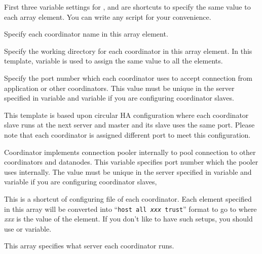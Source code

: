   First three variable settings for ,  and
   are shortcuts to specify the same value to each array element.
  You can write any script for your convenience.
  
  
      Specify each coordinator name in this array element.
  
  
      Specify the working directory for each coordinator in this array element.
      In this template,  variable is used to assign the same value to
	  all the elements.
  
  
      Specify the port number which each coordinator uses to accept connection from application or
	  other coordinators.
      This value must be unique in the server specified in  variable and
	   variable if you are configuring coordinator slaves.
      
      This template is based upon circular HA configuration
      where each coordinator slave runs at the next server and master and its slave uses the same port.
      Please note that each coordinator is assigned different port to meet this configuration.
  
  
      Coordinator implements connection pooler internally to pool connection to other coordinators and datanodes.
      This variable specifies port number which the pooler uses internally.
      The value must be unique in the server specified in  variable and
	   variable if you are configuring coordinator slaves,
  			
  			
      This is a shortcut of configuring  file of each coordinator.
      Each element specified in this array will be converted into ``\texttt{host all \textit{xxx} trust}''
      format to go to  where \textit{xxx} is the value of the element.
      If you don't like to have such setups, you should use  or
	   variable.
  			
  			
      This array specifies what server each coordinator runs.
  			
